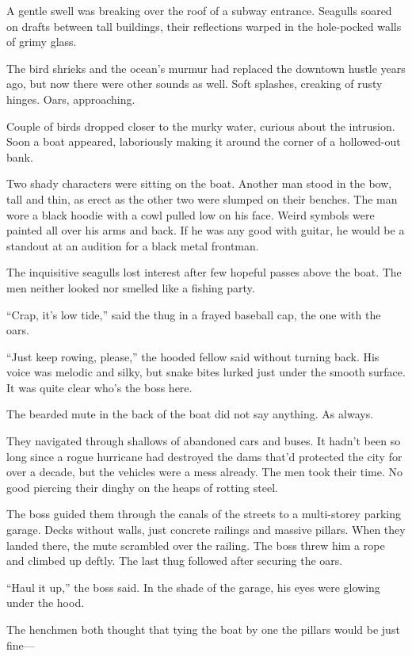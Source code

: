 A gentle swell was breaking over the roof of a subway entrance. Seagulls soared on drafts between tall buildings, their reflections warped in the hole-pocked walls of grimy glass. 

The bird shrieks and the ocean's murmur had replaced the downtown hustle years ago, but now there were other sounds as well. Soft splashes, creaking of rusty hinges. Oars, approaching.

Couple of birds dropped closer to the murky water, curious about the intrusion. Soon a boat appeared, laboriously making it around the corner of a hollowed-out bank. 

Two shady characters were sitting on the boat. Another man stood in the bow, tall and thin, as erect as the other two were slumped on their benches. The man wore a black hoodie with a cowl pulled low on his face. Weird symbols were painted all over his arms and back. If he was any good with guitar, he would be a standout at an audition for a black metal frontman.

The inquisitive seagulls lost interest after few hopeful passes above the boat. The men neither looked nor smelled like a fishing party.
 
``Crap, it's low tide,'' said the thug in a frayed baseball cap, the one with the oars.
 
``Just keep rowing, please,'' the hooded fellow said without turning back. His voice was melodic and silky, but snake bites lurked just under the smooth surface. It was quite clear who's the boss here.

The bearded mute in the back of the boat did not say anything. As always.
 
They navigated through shallows of abandoned cars and buses. It hadn't been so long since a rogue hurricane had destroyed the dams that'd protected the city for over a decade, but the vehicles were a mess already. The men took their time. No good piercing their dinghy on the heaps of rotting steel.
 
The boss guided them through the canals of the streets to a multi-storey parking garage. Decks without walls, just concrete railings and massive pillars. When they landed there, the mute scrambled over the railing. The boss threw him a rope and climbed up deftly. The last thug followed after securing the oars.
 
``Haul it up,'' the boss said. In the shade of the garage, his eyes were glowing under the hood.
 
The henchmen both thought that tying the boat by one the pillars would be just fine---
 
